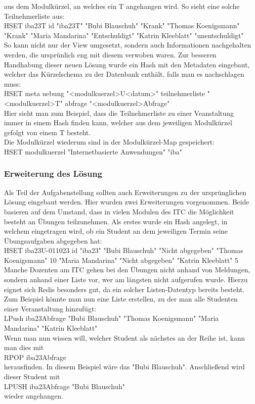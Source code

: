 aus dem Modulkürzel, an welches ein T angehangen wird.
So sieht eine solche Teilnehmerliste aus:\\
HSET iba23T id "iba23T" "Bubi Blauschuh" "Krank" "Thomas Koenigsmann" "Krank" "Maria Mandarina" "Entschuldigt" "Katrin Kleeblatt" "unentschuldigt"\\
So kann nicht nur der View umgesetzt, sondern auch Informationen nachgehalten werden, die ursprünlich eng mit diesem verwoben waren.
Zur besseren Handhabung dieser neuen Lösung wurde  ein Hash mit den Metadaten eingebaut, welcher das Kürzelschema zu der Datenbank enthält, falls man es nachschlagen muss:\\
HSET meta uebung "<modulkuerzel>U<datum>" teilnehmerliste "<modulkuerzel>T" abfrage "<modulkuerzel>Abfrage"\\
Hier sieht man zum Beispiel, dass die Teilnehmerliste zu einer Veanstaltung immer in einem Hash finden kann, welcher aus dem jeweiligen
Modulkürzel gefolgt von einem T besteht.\\
Die Modulkürzel wiederum sind in der Modulkürzel-Map gespeichert:\\
HSET modulkuerzel "Internetbasierte Anwendungen" "iba"\\
\subsubsection{Erweiterung des Lösung}
Als Teil der Aufgabenstellung sollten auch Erweiterungen zu der ursprünglichen Lösung eingebaut werden.
Hier wurden zwei Erweiterungen vorgenommen. Beide basieren auf dem Umstand, dass in vielen Modulen des ITC die Möglichkeit besteht an Übungen teilzunehmen.
Als erstes wurde ein Hash angelegt, in welchem eingetragen wird, ob ein Student an dem jeweiligen Termin seine Übungsaufgaben abgegeben hat:\\
HSET iba23U-011023 id "iba23" "Bubi Blauschuh" "Nicht abgegeben" "Thomas Koenigsmann" 10 "Maria Mandarina" "Nicht abgegeben" "Katrin Kleeblatt" 5\\
Manche Dozenten am ITC gehen bei den Übungen nicht anhand von Meldungen, sondern anhand einer Liste vor, wer am längsten nicht aufgerufen wurde.
Hierzu eignet sich Redis besonders gut, da ein solcher Listen-Datentyp bereits besteht.
Zum Beispiel könnte man nun eine Liste erstellen, zu der man alle Studenten einer Veranstaltung hinzufügt:\\
LPush iba23Abfrage "Bubi Blauschuh" "Thomas Koenigsmann" "Maria Mandarina" "Katrin Kleeblatt"\\
Wenn man nun wissen will, welcher Student als nächstes an der Reihe ist, kann man dies mit \\
RPOP iba23Abfrage \\
herausfinden.  In diesem Beispiel wäre das "Bubi Blauschuh". Anschließend wird dieser Student mit\\
LPUSH iba23Abfrage "Bubi Blauschuh"\\
wieder angehangen.





